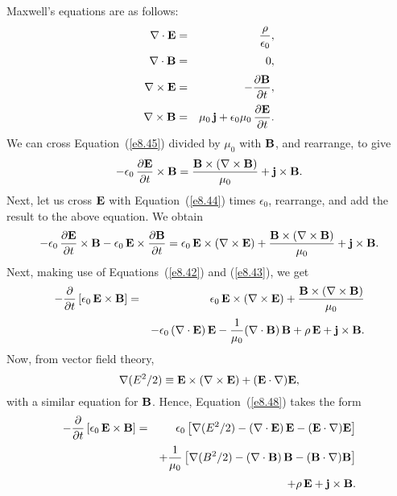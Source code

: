 Maxwell's equations are as follows:
\begin{eqnarray}
\nabla\cdot{\bf E} &=& \frac{\rho}{\epsilon_0},\label{e8.42}\\[0.5ex]
\nabla\cdot{\bf B} &=& 0,\label{e8.43}\\[0.5ex]
\nabla\times{\bf E} &=& - \frac{\partial {\bf B}}{\partial t},\label{e8.44}\\[0.5ex]
\nabla\times{\bf B}&=& \mu_0\,{\bf j} + \epsilon_0\mu_0\, \frac{\partial {\bf E}}{\partial t}.\label{e8.45}
\end{eqnarray}
We can cross Equation~(\ref{e8.45}) divided by $\mu_0$ with ${\bf B}$, and rearrange, to give
\begin{equation}
-\epsilon_0\,\frac{\partial {\bf E}}{\partial t}\times {\bf B} = \frac{{\bf B}\times(\nabla\times {\bf B})}{\mu_0} + {\bf j}\times {\bf B}.
\end{equation}
Next, let us cross ${\bf E}$ with Equation~(\ref{e8.44}) times $\epsilon_0$,
rearrange, and add the result to the above equation. We obtain
\begin{equation}
-\epsilon_0\,\frac{\partial {\bf E}}{\partial t}\times {\bf B}-\epsilon_0\,
{\bf E}\times\frac{\partial {\bf B}}{\partial t}  = 
\epsilon_0\,{\bf E}\times (\nabla\times{\bf E})+\frac{{\bf B}\times(\nabla\times {\bf B})}{\mu_0} + {\bf j}\times {\bf B}.
\end{equation}
Next, making use of Equations~(\ref{e8.42}) and (\ref{e8.43}), we get
\begin{eqnarray}\label{e8.48}
-\frac{\partial}{\partial t} \left[\epsilon_0\,{\bf E}\times{\bf B}\right]&=&
\epsilon_0\,{\bf E}\times (\nabla\times{\bf E})+\frac{{\bf B}\times(\nabla\times {\bf B})}{\mu_0}\nonumber\\[0.5ex]&& - \epsilon_0\,(\nabla\cdot {\bf E}) \,{\bf E} - \frac{1}{\mu_0}(\nabla\cdot {\bf B}) \,{\bf B}+ 
\rho\,{\bf E}+{\bf j}\times {\bf B}.
\end{eqnarray}
Now, from vector field theory,
\begin{equation}
\nabla (E^2/2) \equiv {\bf E}\times(\nabla\times {\bf E}) + ({\bf E}\cdot{\nabla}){\bf E},
\end{equation}
with a similar equation for ${\bf B}$. Hence, Equation~(\ref{e8.48})
takes the form
\begin{eqnarray}
-\frac{\partial}{\partial t} \left[\epsilon_0\,{\bf E}\times{\bf B}\right]&=&
\epsilon_0\left[\nabla(E^2/2) - (\nabla\cdot {\bf E})\,{\bf E} - ({\bf E}\cdot\nabla){\bf E}\right]\nonumber\\[0.5ex]&& 
+\frac{1}{\mu_0}\left[\nabla(B^2/2) - (\nabla\cdot {\bf B})\,{\bf B} - ({\bf B}\cdot\nabla){\bf B}\right]\nonumber\\[0.5ex]&&+
\rho\,{\bf E}+{\bf j}\times {\bf B}.
\end{eqnarray}
